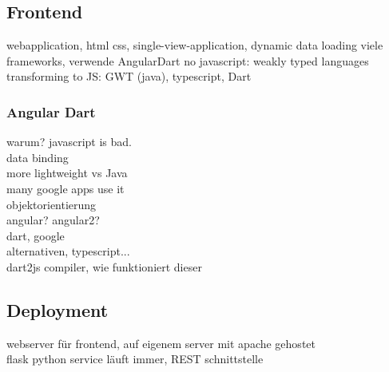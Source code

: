 \subsection{Frontend}

webapplication, html css, single-view-application, dynamic data loading
viele frameworks, verwende AngularDart
no javascript: weakly typed languages transforming to JS: GWT (java), typescript, Dart

\subsubsection{Angular Dart}
\label{sec:angulardart}
warum? javascript is bad.\\

data binding\\
more lightweight vs Java\\

many google apps use it\\
objektorientierung\\

angular? angular2?\\

dart, google\\
alternativen, typescript...\\

dart2js compiler, wie funktioniert dieser\\

\subsection{Deployment}
\label{sec:deployment}
webserver für frontend, auf eigenem server mit apache gehostet\\
flask python service läuft immer, REST schnittstelle\\





